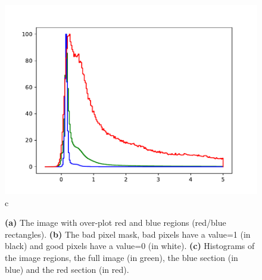 \begin{figure}
\begin{center}
\begin{minipage}{.495\textwidth}
\begin{center}
\includegraphics[width=\textwidth]{Figures/cal_DARK_spirou_3.pdf}
c
\end{center}
\end{minipage}%
\end{center}

\caption{\textbf{(a)} The image with over-plot red and blue regions (red/blue rectangles). \textbf{(b)} The bad pixel mask, bad pixels have a value=1 (in black) and good pixels have a value=0 (in white). \textbf{(c)} Histograms of the image regions, the full image (in green), the blue section (in blue) and the red section (in red). \label{figure:cal_DARK_spirou}}
\end{figure}


